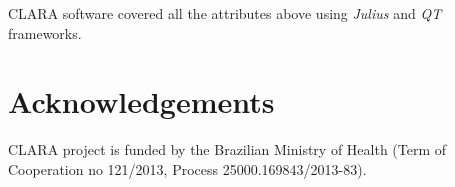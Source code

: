 \documentclass{svproc}
\begin{document}
\begin{multicols}{2}
	CLARA software covered all the attributes above using \textit{Julius} and \textit{QT} frameworks. 
	
	\section{Acknowledgements}
	
	CLARA project is funded by the Brazilian Ministry of Health (Term of Cooperation no 121/2013, Process 25000.169843/2013-83). 
		
	
	 
	
	\end{multicols}
	
\end{document}
